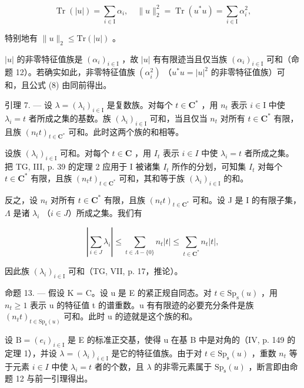 \[
\operatorname{Tr} (| u |) = \sum_ {i \in \mathrm{I}} \alpha_ {i}, \quad \| u \| _ {2} ^ {2} = \operatorname{Tr} (u ^ {*} u) = \sum_ {i \in \mathrm{I}} \alpha_ {i} ^ {2},\tag{8}
\]

特别地有 \(\|u\|_{2}\leqslant\mathrm{Tr}(|u|)\) 。

\(|u|\) 的非零特征值族是 \((\alpha_{i})_{i\in \mathrm{I}}\) ，故 \(|u|\) 有有限迹当且仅当族 \((\alpha_{i})_{i\in \mathrm{I}}\) 可和（命题 12）。若确实如此，非零特征值族 \((\alpha_{i}^{2})\) （\(u^{*}u = |u|^{2}\) 的非零特征值族）可和，且公式 (8) 由同前得出。

引理 7. --- 设 \(\lambda = (\lambda_i)_{i \in \mathrm{I}}\) 是复数族。对每个 \(t \in \mathbf{C}^*\) ，用 \(n_t\) 表示 \(i \in \mathrm{I}\) 中使 \(\lambda_i = t\) 者所成之集的基数。族 \((\lambda_i)_{i \in \mathrm{I}}\) 可和，当且仅当 \(n_t\) 对所有 \(t \in \mathbf{C}^*\) 有限，且族 \((n_t t)_{t \in \mathbf{C}^*}\) 可和。此时这两个族的和相等。

设族 \((\lambda_{i})_{i\in\mathrm{I}}\) 可和。对每个 \(t\in\mathbf{C}\) ，用 \(I_{t}\) 表示 \(i\in I\) 中使 \(\lambda_{i}=t\) 者所成之集。把 TG, III, p. 39 的定理 2 应用于 I 被诸集 \(I_{t}\) 所作的分划，可知集 \(I_{t}\) 对每个 \(t\in\mathbf{C}^{*}\) 有限，且族 \((n_{t}t)_{t\in\mathbf{C}^{*}}\) 可和，其和等于族 \((\lambda_{i})_{i\in\mathrm{I}}\) 的和。

反之，设 \(n_{t}\) 对所有 \(t \in \mathbf{C}^{*}\) 有限，且族 \((n_{t}t)_{t \in \mathbf{C}^{*}}\) 可和。设 J 是 I 的有限子集，\(\Lambda\) 是诸 \(\lambda_{i}\) （\(i \in J\)）所成之集。我们有

\[
\left| \sum_ {i \in J} \lambda_ {i} \right| \leqslant \sum_ {t \in \Lambda - \{0 \}} n _ {t} | t | \leqslant \sum_ {t \in \mathbf {C} ^ {*}} n _ {t} | t |,
\]

因此族 \((\lambda_{i})_{i\in\mathrm{I}}\) 可和（TG, VII, p. 17，推论）。

命题 13. --- 假设 K = C。设 u 是 E 的紧正规自同态。对 \(t \in \mathrm{Sp}_{\mathrm{s}}(u)\) ，用 \(n_{t} \geqslant 1\) 表示 u 的特征值 t 的谱重数。u 有有限迹的必要充分条件是族 \((n_{t}t)_{t \in \mathrm{Sp}_{\mathrm{s}}(u)}\) 可和。此时 u 的迹就是这个族的和。

设 \(\mathrm{B} = (e_i)_{i \in \mathrm{I}}\) 是 E 的标准正交基，使得 u 在基 B 中是对角的（IV, p. 149 的定理 1），并设 \(\lambda = (\lambda_i)_{i \in \mathrm{I}}\) 是它的特征值族。由于对 \(t \in \mathrm{Sp}_\mathrm{s}(u)\) ，重数 \(n_t\) 等于元素 \(i \in I\) 中使 \(\lambda_i = t\) 者的个数，且 \(\lambda\) 的非零元素属于 \(\mathrm{Sp}_{\mathrm{s}}(u)\) ，断言即由命题 12 与前一引理得出。

